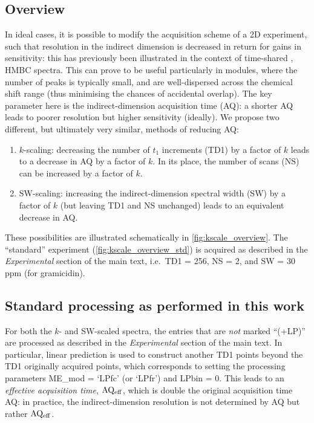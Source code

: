 \subsection{Overview}

In ideal cases, it is possible to modify the acquisition scheme of a 2D experiment, such that resolution in the indirect dimension is decreased in return for gains in sensitivity: this has previously been illustrated in the context of time-shared \nitrogen{},\carbon{} HMBC spectra.\autocite{Perez-Trujillo2007MRC,Parella2010CMR}
This can prove to be useful particularly in \nitrogen{} modules, where the number of peaks is typically small, and are well-dispersed across the chemical shift range (thus minimising the chances of accidental overlap).
The key parameter here is the indirect-dimension acquisition time (AQ): a shorter AQ leads to poorer resolution but higher sensitivity (ideally).
We propose two different, but ultimately very similar, methods of reducing AQ:

\begin{enumerate}
    \item $k$-scaling: decreasing the number of $t_1$ increments (TD1) by a factor of $k$ leads to a decrease in AQ by a factor of $k$. In its place, the number of scans (NS) can be increased by a factor of $k$.
    \item SW-scaling: increasing the indirect-dimension spectral width (SW) by a factor of $k$ (but leaving TD1 and NS unchanged) leads to an equivalent decrease in AQ.
\end{enumerate}

These possibilities are illustrated schematically in \cref{fig:kscale_overview}.
The ``standard'' experiment (\cref{fig:kscale_overview_std}) is acquired as described in the \textit{Experimental} section of the main text, i.e.\ TD1 = 256, NS = 2, and SW = 30 ppm (for gramicidin).

\subsection{Standard processing as performed in this work}

For both the $k$- and SW-scaled spectra, the entries that are \textit{not} marked ``(+LP)'' are processed as described in the \textit{Experimental} section of the main text.
In particular, linear prediction is used to construct another TD1 points beyond the TD1 originally acquired points, which corresponds to setting the processing parameters ME\_mod = `LPfc' (or `LPfr') and LPbin = 0.
This leads to an \textit{effective acquisition time}, $\mathrm{AQ_{eff}}$, which is double the original acquisition time AQ: in practice, the indirect-dimension resolution is not determined by AQ but rather $\mathrm{AQ_{eff}}$.


